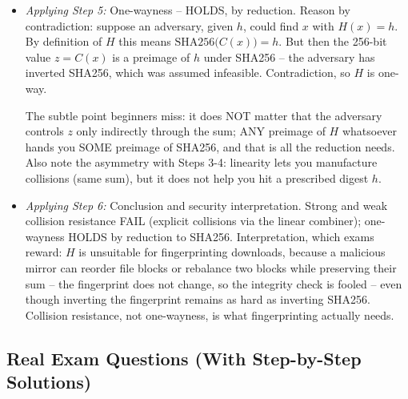 \documentclass[12pt, a4paper]{article}
\newcommand{\term}[1]{\textbf{\textit{#1}}}        %
\begin{document}
\begin{itemize}
    The trick from Step 3 must be adapted so that it works for THIS $x$: compute the target sum $S = \big(\sum_i x_i\big) \bmod 2^{256}$ and build any $y$ with the same sum.
    Take $y = y_1 \| y_2$ with $y_1$ arbitrary and $y_2 = (S - y_1) \bmod 2^{256}$; then $C(y) = (y_1 + y_2) \bmod 2^{256} = S = C(x)$, so $H(y) = H(x)$.
    Concrete numbers: if $x = 7 \| 9$ then $S = 16$; choose $y_1 = 4$, $y_2 = (16 - 4) \bmod 2^{256} = 12$; check: $H(y) = \mathrm{SHA256}(16) = H(x)$.
    Edge case a careful answer mentions: with negligible probability $2^{-256}$ your $y$ equals $x$ -- then just pick another $y_1$.

    The subtraction always works because every integer $v$ has an \term{additive inverse} mod $2^{256}$: the value $(2^{256} - v) \bmod 2^{256}$, which added to $v$ gives $0$ -- so $y_2 = (S - y_1) \bmod 2^{256}$ exists for every $y_1$, unlike the multiplicative case where an inverse exists only for odd coefficients.
    \item \textit{Applying Step 5:} One-wayness -- HOLDS, by reduction. Reason by contradiction: suppose an adversary, given $h$, could find $x$ with $H(x) = h$.
    By definition of $H$ this means $\mathrm{SHA256}\big(C(x)\big) = h$. But then the 256-bit value $z = C(x)$ is a preimage of $h$ under SHA256 -- the adversary has inverted SHA256, which was assumed infeasible. Contradiction, so $H$ is one-way.

    The subtle point beginners miss: it does NOT matter that the adversary controls $z$ only indirectly through the sum; ANY preimage of $H$ whatsoever hands you SOME preimage of SHA256, and that is all the reduction needs.
    Also note the asymmetry with Steps 3-4: linearity lets you manufacture collisions (same sum), but it does not help you hit a prescribed digest $h$.
    \item \textit{Applying Step 6:} Conclusion and security interpretation. Strong and weak collision resistance FAIL (explicit collisions via the linear combiner); one-wayness HOLDS by reduction to SHA256.
    Interpretation, which exams reward: $H$ is unsuitable for fingerprinting downloads, because a malicious mirror can reorder file blocks or rebalance two blocks while preserving their sum -- the fingerprint does not change, so the integrity check is fooled -- even though inverting the fingerprint remains as hard as inverting SHA256. Collision resistance, not one-wayness, is what fingerprinting actually needs.
\end{itemize}

\subsection*{Real Exam Questions (With Step-by-Step Solutions)}
\end{document}
